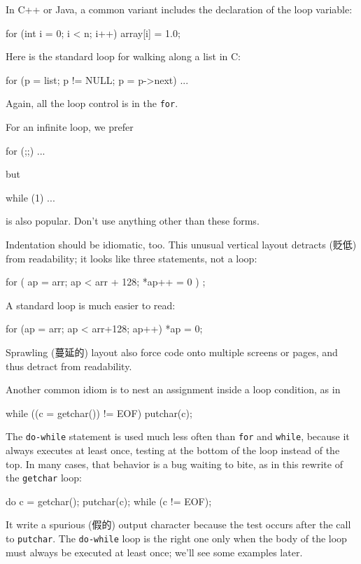 In C++ or Java, a common variant includes the declaration of the loop
variable:
\begin{wellcode}
    for (int i = 0; i < n; i++)
        array[i] = 1.0;
\end{wellcode}
Here is the standard loop for walking along a list in C:
\begin{wellcode}
    for (p = list; p != NULL; p = p->next)
        ...
\end{wellcode}
Again, all the loop control is in the \verb'for'.

For an infinite loop, we prefer 
\begin{wellcode}
    for (;;)
        ...
\end{wellcode}
but 
\begin{wellcode}
    while (1)
        ...
\end{wellcode}
is also popular. Don't use anything other than these forms.

Indentation should be idiomatic, too. This unusual vertical layout
detracts (贬低) from readability; it looks like three statements, not a loop:
\begin{badcode}
    for (
        ap = arr;
        ap < arr + 128;
        *ap++ = 0
        )
    {
        ;
    }
\end{badcode}
A standard loop is much easier to read:
\begin{wellcode}
    for (ap = arr; ap < arr+128; ap++)
        *ap = 0;
\end{wellcode}
Sprawling (蔓延的) layout also force code onto multiple screens or pages,
and thus detract from readability.

Another common idiom is to nest an assignment inside a loop condition, as
in 
\begin{wellcode}
    while ((c = getchar()) != EOF)
        putchar(c);
\end{wellcode}
The \verb'do-while' statement is used much less often than \verb'for' and
\verb'while', because it always executes at least once, testing at the
bottom of the loop instead of the top. In many cases, that behavior is a
bug waiting to bite, as in this rewrite of the \verb'getchar' loop:
\begin{badcode}
    do {
        c = getchar();
        putchar(c);
    } while (c != EOF);
\end{badcode}
It write a spurious (假的) output character because the test occurs after
the call to \verb'putchar'. The \verb'do-while' loop is the right one only
when the body of the loop must always be executed at least once; we'll see
some examples later.

